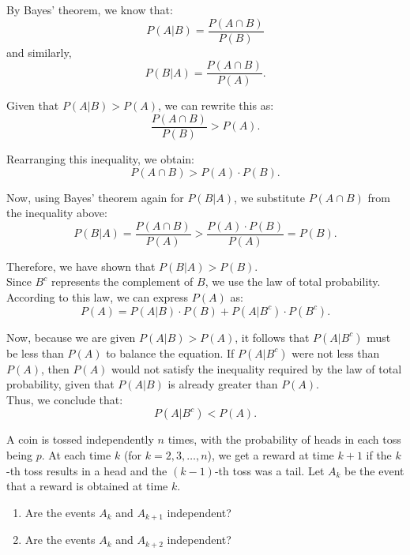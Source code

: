 \begin{solution}
    By Bayes' theorem, we know that:
    \[
    P(A|B) = \frac{P(A \cap B)}{P(B)}
    \]
    and similarly,
    \[
    P(B|A) = \frac{P(A \cap B)}{P(A)}.
    \]
 
    Given that \( P(A|B) > P(A) \), we can rewrite this as:
    \[
    \frac{P(A \cap B)}{P(B)} > P(A).
    \]
 
    Rearranging this inequality, we obtain:
    \[
    P(A \cap B) > P(A) \cdot P(B).
    \]
 
    Now, using Bayes' theorem again for \( P(B|A) \), we substitute \( P(A \cap B) \) from the inequality above:
    \[
    P(B|A) = \frac{P(A \cap B)}{P(A)} > \frac{P(A) \cdot P(B)}{P(A)} = P(B).
    \]
 
    Therefore, we have shown that \( P(B|A) > P(B) \).\\
 
    Since \( B^c \) represents the complement of \( B \), we use the law of total probability. According to this law, we can express \( P(A) \) as:
    \[
    P(A) = P(A|B) \cdot P(B) + P(A|B^c) \cdot P(B^c).
    \]
 
    Now, because we are given \( P(A|B) > P(A) \), it follows that \( P(A|B^c) \) must be less than \( P(A) \) to balance the equation. If \( P(A|B^c) \) were not less than \( P(A) \), then \( P(A) \) would not satisfy the inequality required by the law of total probability, given that \( P(A|B) \) is already greater than \( P(A) \).\\
 
    Thus, we conclude that:
    \[
    P(A|B^c) < P(A).
    \]
\end{solution}

\begin{exercise}
    A coin is tossed independently \( n \) times, with the probability of heads in each toss being \( p \). At each time \( k \) (for \( k = 2, 3, \dots, n \)), we get a reward at time \( k + 1 \) if the \( k \)-th toss results in a head and the \((k-1)\)-th toss was a tail. Let \( A_k \) be the event that a reward is obtained at time \( k \).

\begin{enumerate}
    \item Are the events \( A_k \) and \( A_{k+1} \) independent?
    \item Are the events \( A_k \) and \( A_{k+2} \) independent?
\end{enumerate}
\end{exercise}

